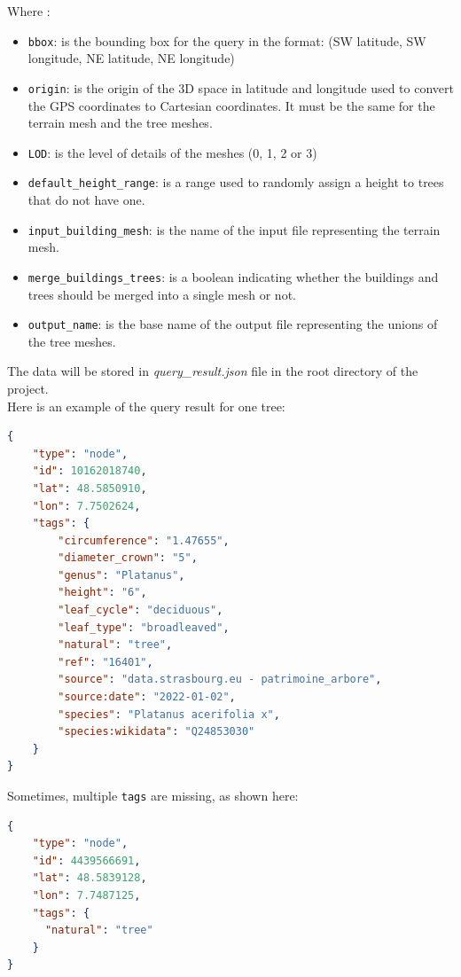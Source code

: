 \documentclass[12pt]{article}
\begin{document}
Where :
\begin{itemize}
    \item \texttt{bbox}: is the bounding box for the query in the format:
    \subitem (SW latitude, SW longitude, NE latitude, NE longitude)
    \item \texttt{origin}: is the origin of the 3D space in latitude and longitude
    used to convert the GPS coordinates to Cartesian coordinates. It must be the
    same for the terrain mesh and the tree meshes.
    \item \texttt{LOD}: is the level of details of the meshes (0, 1, 2 or 3)
    \item \texttt{default\_height\_range}: is a range used to randomly assign a
    height to trees that do not have one.
    \item \texttt{input\_building\_mesh}: is the name of the input file
    representing the terrain mesh.
    \item \texttt{merge\_buildings\_trees}: is a boolean indicating whether the
    buildings and trees should be merged into a single mesh or not.
    \item \texttt{output\_name}: is the base name of the output file
    representing the unions of the tree meshes.
\end{itemize}

The data will be stored in \textit{query\_result.json} file in the root directory
 of the project. \\
Here is an example of the query result for one tree:

\begin{lstlisting}[language=json]
{
    "type": "node",
    "id": 10162018740,
    "lat": 48.5850910,
    "lon": 7.7502624,
    "tags": {
        "circumference": "1.47655",
        "diameter_crown": "5",
        "genus": "Platanus",
        "height": "6",
        "leaf_cycle": "deciduous",
        "leaf_type": "broadleaved",
        "natural": "tree",
        "ref": "16401",
        "source": "data.strasbourg.eu - patrimoine_arbore",
        "source:date": "2022-01-02",
        "species": "Platanus acerifolia x",
        "species:wikidata": "Q24853030"
    }
}
\end{lstlisting}

Sometimes, multiple \texttt{tags} are missing, as shown here:

\begin{lstlisting}[language=json]
{
    "type": "node",
    "id": 4439566691,
    "lat": 48.5839128,
    "lon": 7.7487125,
    "tags": {
      "natural": "tree"
    }
}
\end{lstlisting}
\end{document}
